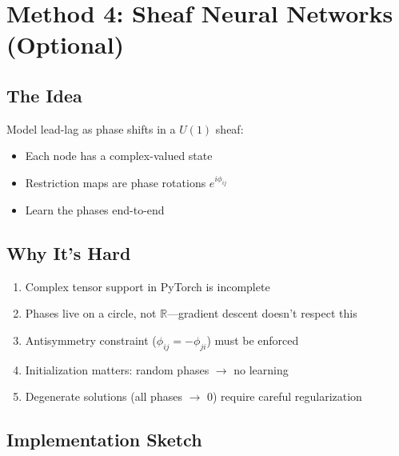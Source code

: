 \documentclass[11pt, a4paper]{article}
\begin{document}
\section{Method 4: Sheaf Neural Networks (Optional)}

\subsection{The Idea}

Model lead-lag as phase shifts in a $U(1)$ sheaf:
\begin{itemize}
    \item Each node has a complex-valued state
    \item Restriction maps are phase rotations $e^{i\phi_{ij}}$
    \item Learn the phases end-to-end
\end{itemize}

\subsection{Why It's Hard}

\begin{enumerate}
    \item Complex tensor support in PyTorch is incomplete
    \item Phases live on a circle, not $\mathbb{R}$---gradient descent doesn't respect this
    \item Antisymmetry constraint ($\phi_{ij} = -\phi_{ji}$) must be enforced
    \item Initialization matters: random phases $\to$ no learning
    \item Degenerate solutions (all phases $\to$ 0) require careful regularization
\end{enumerate}

\subsection{Implementation Sketch}
\end{document}
